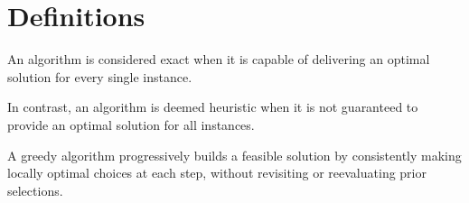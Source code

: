 \section{Definitions}

\begin{definition}
    An algorithm is considered exact when it is capable of delivering an optimal solution for every single instance.
\end{definition}
\begin{definition}
    In contrast, an algorithm is deemed heuristic when it is not guaranteed to provide an optimal solution for all instances.
\end{definition}
\begin{definition}
    A greedy algorithm progressively builds a feasible solution by consistently making locally optimal choices at each step, without revisiting or reevaluating prior selections.
\end{definition}